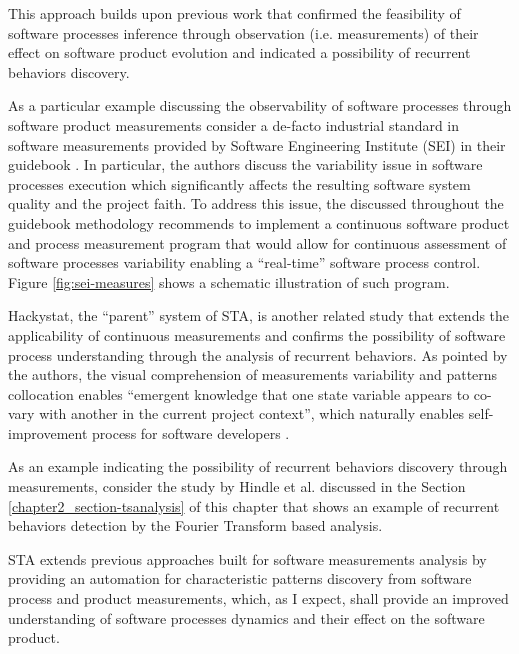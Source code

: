 This approach builds upon previous work that confirmed the feasibility of software processes inference through 
observation (i.e. measurements) of their effect on software product evolution and indicated a possibility of 
recurrent behaviors discovery. 

As a particular example discussing the observability of software processes through software product measurements 
consider a de-facto industrial standard in software measurements provided by Software Engineering Institute (SEI) in 
their guidebook \cite{citeulike:10567306}. 
In particular, the authors discuss the variability issue in software processes execution which significantly 
affects the resulting software system quality and the project faith. 
To address this issue, the discussed throughout the guidebook methodology recommends to implement a continuous 
software product and process measurement program that would allow for continuous assessment of software processes 
variability enabling a ``real-time'' software process control. Figure \ref{fig:sei-measures} shows a schematic 
illustration of such program.

Hackystat, the ``parent'' system of STA, is another related study that extends the applicability of continuous 
measurements and confirms the possibility of software process understanding through the analysis of recurrent 
behaviors\cite{citeulike:557296}. 
As pointed by the authors, the visual comprehension of measurements variability and patterns collocation enables 
``emergent knowledge that one state variable appears to co-vary with another in the current project context'',
which naturally enables self-improvement process for software developers \cite{citeulike:557296}. 

As an example indicating the possibility of recurrent behaviors discovery through measurements, consider the 
study by Hindle et al. \cite{citeulike:10377345} discussed in the Section \ref{chapter2_section-tsanalysis} of 
this chapter that shows an example of recurrent behaviors detection by the Fourier Transform based analysis.

STA extends previous approaches built for software measurements analysis by providing an automation for 
characteristic patterns discovery from software process and product measurements, which, as I expect, shall 
provide an improved understanding of software processes dynamics and their effect on the software product.

